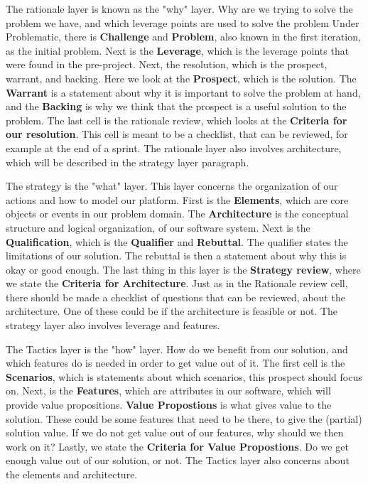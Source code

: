 The rationale layer is known as the "why" layer.
Why are we trying to solve the problem we have, and which leverage points are used to solve the problem
Under Problematic, there is \textbf{Challenge} and \textbf{Problem}, also known in the first iteration, as the initial problem.
Next is the \textbf{Leverage}, which is the leverage points that were found in the pre-project.
Next, the resolution, which is the prospect, warrant, and backing. 
Here we look at the \textbf{Prospect}, which is the solution.
The \textbf{Warrant} is a statement about why it is important to solve the problem at hand, and the \textbf{Backing} is why we think that the prospect is a useful solution to the problem.
The last cell is the rationale review, which looks at the \textbf{Criteria for our resolution}.
This cell is meant to be a checklist, that can be reviewed, for example at the end of a sprint.
The rationale layer also involves architecture, which will be described in the strategy layer paragraph.

The strategy is the "what" layer.
This layer concerns the organization of our actions and how to model our platform.
First is the \textbf{Elements}, which are core objects or events in our problem domain.
The \textbf{Architecture} is the conceptual structure and logical organization, of our software system.
Next is the \textbf{Qualification}, which is the \textbf{Qualifier} and \textbf{Rebuttal}.
The qualifier states the limitations of our solution.
The rebuttal is then a statement about why this is okay or good enough.
The last thing in this layer is the \textbf{Strategy review}, where we state the \textbf{Criteria for Architecture}.
Just as in the Rationale review cell, there should be made a checklist of questions that can be reviewed, about the architecture.
One of these could be if the architecture is feasible or not.
The strategy layer also involves leverage and features.

The Tactics layer is the "how" layer.
How do we benefit from our solution, and which features do is needed in order to get value out of it.
The first cell is the \textbf{Scenarios}, which is statements about which scenarios, this prospect should focus on.
Next, is the \textbf{Features}, which are attributes in our software, which will provide value propositions.
\textbf{Value Propostions} is what gives value to the solution.
These could be some features that need to be there, to give the (partial) solution value. 
If we do not get value out of our features, why should we then work on it?
Lastly, we state the \textbf{Criteria for Value Propostions}.
Do we get enough value out of our solution, or not.
The Tactics layer also concerns about the elements and architecture.

